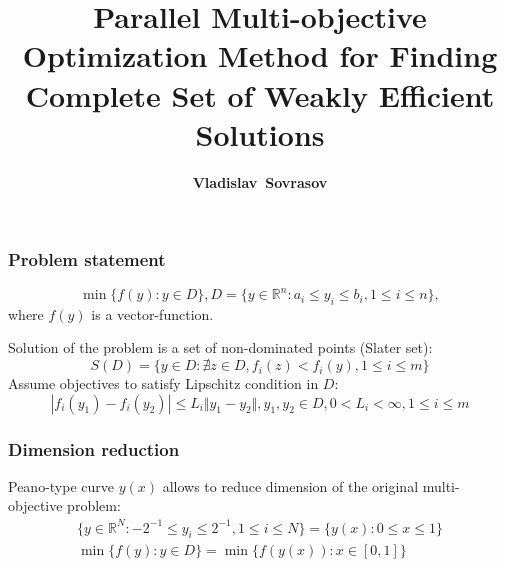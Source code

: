 \documentclass[aspectratio=1610]{beamer}
\title{Parallel Multi-objective Optimization Method for Finding Complete Set of Weakly Efficient Solutions}
\author{\textbf{Vladislav~Sovrasov}}
\institute{Lobachevsky University of Nizhni Novgorod}
\date{}
\begin{document}
\begin{frame}
\titlepage
\end{frame}

\begin{frame}
  \begin{center}
  \frametitle{Problem statement}

  \begin{displaymath}
    \min\{f(y): y\in D\}, D=\{y\in \mathbb{R}^n: a_i \leqslant y_i \leqslant b_i, 1\leqslant i \leqslant n \},
  \end{displaymath}
where \(f(y)\) is a vector-function.

\enspace
Solution of the problem is a set of non-dominated points (Slater set):
  \begin{displaymath}
    S(D) = \{y\in D: \nexists z\in D, f_i(z)<f_i(y),1\leqslant i \leqslant m\}
  \end{displaymath}
Assume objectives to satisfy Lipschitz condition in \(D\):
  \begin{displaymath}
    |f_i(y_1)-f_i(y_2)|\leqslant L_i\Vert y_1-y_2\Vert,y_1,y_2\in D,0<L_i<\infty,1\leqslant i\leqslant m
  \end{displaymath}

\end{center}
\end{frame}

\begin{frame}
  \frametitle{Dimension reduction}
  Peano-type curve \(y(x)\) allows to reduce dimension of the original multi-objective problem:
  \begin{gather}
    \lbrace y\in \mathbb{R}^N:-2^{-1}\leqslant y_i\leqslant 2^{-1},1\leqslant i\leqslant N\rbrace=\{y(x):0\leqslant x\leqslant 1\} \nonumber \\
    \min\{f(y): y\in D\}=\min\{f(y(x)): x\in [0,1]\} \nonumber
  \end{gather}

  \begin{figure}[ht]
  \end{figure}
\end{frame}
\end{document}
